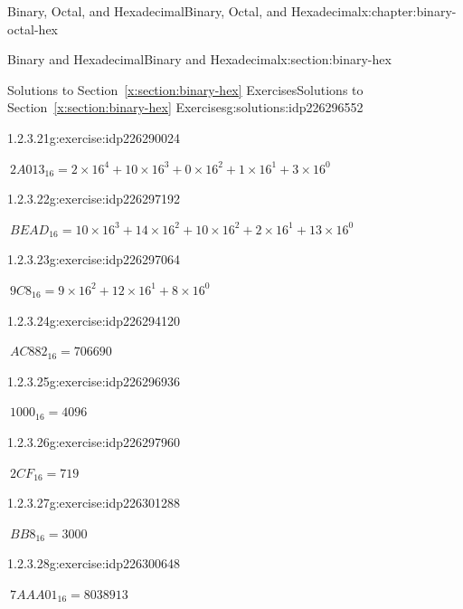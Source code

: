 \documentclass[twoside,10pt,]{book}
\newcommand{\xreffont}{\relax}
\numberwithin{equation}{section}
\begin{document}
\begin{chapterptx}{Binary, Octal, and Hexadecimal}{}{Binary, Octal, and Hexadecimal}{}{}{x:chapter:binary-octal-hex}
\begin{sectionptx}{Binary and Hexadecimal}{}{Binary and Hexadecimal}{}{}{x:section:binary-hex}
\begin{solutions-subsection}{Solutions to Section~{\xreffont\ref*{x:section:binary-hex}} Exercises}{}{Solutions to Section~{\xreffont\ref*{x:section:binary-hex}} Exercises}{}{}{g:solutions:idp226296552}
\begin{exercisegroup}
\begin{divisionsolutioneg}{1.2.3.21}{}{g:exercise:idp226290024}%
\par\smallskip%
\noindent\hypertarget{g:solution:idp226298216-main}{}\(\ 2A013_{16}=2\times16^4+10\times16^3+0\times16^2+1\times16^1+3\times16^0\)\end{divisionsolutioneg}%
\begin{divisionsolutioneg}{1.2.3.22}{}{g:exercise:idp226297192}%
\par\smallskip%
\noindent\hypertarget{g:solution:idp226299880-main}{}\(\ BEAD_{16}=10\times16^3+14\times16^2+10\times16^2+2\times16^1+13\times16^0\)\end{divisionsolutioneg}%
\begin{divisionsolutioneg}{1.2.3.23}{}{g:exercise:idp226297064}%
\par\smallskip%
\noindent\hypertarget{g:solution:idp226299368-main}{}\(\ 9C8_{16}=9\times16^2+12\times16^1+8\times16^0\)\end{divisionsolutioneg}%
\end{exercisegroup}
\par\medskip\noindent
\begin{exercisegroup}
\begin{divisionsolutioneg}{1.2.3.24}{}{g:exercise:idp226294120}%
\par\smallskip%
\noindent\hypertarget{g:solution:idp226300136-main}{}\(\ AC882_{16}=706690\)\end{divisionsolutioneg}%
\begin{divisionsolutioneg}{1.2.3.25}{}{g:exercise:idp226296936}%
\par\smallskip%
\noindent\hypertarget{g:solution:idp226300008-main}{}\(\ 1000_{16}=4096\)\end{divisionsolutioneg}%
\begin{divisionsolutioneg}{1.2.3.26}{}{g:exercise:idp226297960}%
\par\smallskip%
\noindent\hypertarget{g:solution:idp226297576-main}{}\(\ 2CF_{16}=719\)\end{divisionsolutioneg}%
\begin{divisionsolutioneg}{1.2.3.27}{}{g:exercise:idp226301288}%
\par\smallskip%
\noindent\hypertarget{g:solution:idp226298088-main}{}\(\ BB8_{16}=3000\)\end{divisionsolutioneg}%
\begin{divisionsolutioneg}{1.2.3.28}{}{g:exercise:idp226300648}%
\par\smallskip%
\noindent\hypertarget{g:solution:idp226301416-main}{}\(\ 7AAA01_{16}=8038913\)\end{divisionsolutioneg}%

\end{exercisegroup}
\end{solutions-subsection}
\end{sectionptx}
\end{chapterptx}
\end{document}
